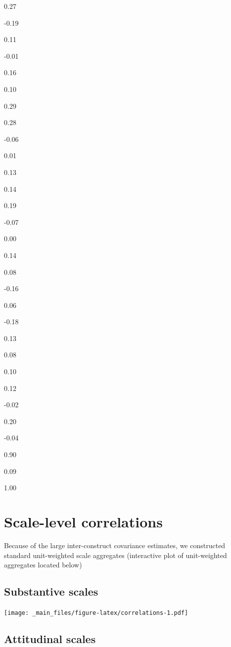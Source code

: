 \documentclass[
]{book}
\begin{document}
0.27

-0.19

0.11

-0.01

0.16

0.10

0.29

0.28

-0.06

0.01

0.13

0.14

0.19

-0.07

0.00

0.14

0.08

-0.16

0.06

-0.18

0.13

0.08

0.10

0.12

-0.02

0.20

-0.04

0.90

0.09

1.00

\hypertarget{scale-level-correlations}{%
\section{Scale-level correlations}\label{scale-level-correlations}}

Because of the large inter-construct covariance estimates, we constructed standard unit-weighted scale aggregates (interactive plot of unit-weighted aggregates located below)

\hypertarget{substantive-scales}{%
\subsection{Substantive scales}\label{substantive-scales}}

\texttt{[image: \_main\_files/figure-latex/correlations-1.pdf]}

\hypertarget{attitudinal-scales}{%
\subsection{Attitudinal scales}\label{attitudinal-scales}}
\end{document}
